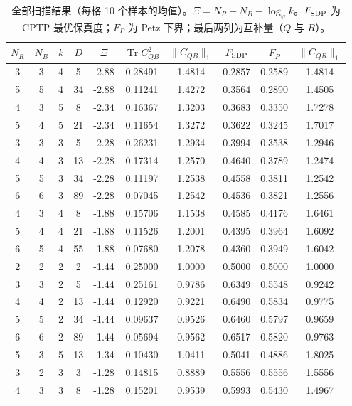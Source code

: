\documentclass[11pt,a4paper]{ctexart}
\theoremstyle{definition}
\newcommand{\Tr}{\operatorname{Tr}}
\newcommand{\ph}{\varphi}
\begin{document}
\begin{table}[h]\centering
\caption{全部扫描结果（每格 10 个样本的均值）。$\Xi=N_R-N_B-\log_\ph k$。$F_{\rm SDP}$ 为 CPTP 最优保真度；$F_P$ 为 Petz 下界；最后两列为互补量（$Q$ 与 $R$）。}
\label{tab:scan}
\small
\begin{tabular}{cccccccccc}
\toprule
$N_R$ & $N_B$ & $k$ & $D$ & $\Xi$ & $\Tr C_{QB}^2$ & $\|C_{QB}\|_1$ & $F_{\rm SDP}$ & $F_P$ & $\|C_{QR}\|_1$\\
\midrule
3 & 3 & 4 & 5 & -2.88 & 0.28491 & 1.4814 & 0.2857 & 0.2589 & 1.4814 \\
5 & 5 & 4 & 34 & -2.88 & 0.11241 & 1.4272 & 0.3564 & 0.2890 & 1.4505 \\
4 & 3 & 5 & 8 & -2.34 & 0.16367 & 1.3203 & 0.3683 & 0.3350 & 1.7278 \\
5 & 4 & 5 & 21 & -2.34 & 0.11654 & 1.3272 & 0.3622 & 0.3245 & 1.7017 \\
3 & 3 & 3 & 5 & -2.28 & 0.26231 & 1.2934 & 0.3994 & 0.3538 & 1.2946 \\
4 & 4 & 3 & 13 & -2.28 & 0.17314 & 1.2570 & 0.4640 & 0.3789 & 1.2474 \\
5 & 5 & 3 & 34 & -2.28 & 0.11197 & 1.2538 & 0.4558 & 0.3811 & 1.2542 \\
6 & 6 & 3 & 89 & -2.28 & 0.07045 & 1.2542 & 0.4536 & 0.3821 & 1.2556 \\
4 & 3 & 4 & 8 & -1.88 & 0.15706 & 1.1538 & 0.4585 & 0.4176 & 1.6461 \\
5 & 4 & 4 & 21 & -1.88 & 0.11526 & 1.2001 & 0.4395 & 0.3964 & 1.6092 \\
6 & 5 & 4 & 55 & -1.88 & 0.07680 & 1.2078 & 0.4360 & 0.3949 & 1.6042 \\
2 & 2 & 2 & 2 & -1.44 & 0.25000 & 1.0000 & 0.5000 & 0.5000 & 1.0000 \\
3 & 3 & 2 & 5 & -1.44 & 0.25161 & 0.9786 & 0.6349 & 0.5548 & 0.9242 \\
4 & 4 & 2 & 13 & -1.44 & 0.12920 & 0.9221 & 0.6490 & 0.5834 & 0.9775 \\
5 & 5 & 2 & 34 & -1.44 & 0.09637 & 0.9526 & 0.6460 & 0.5797 & 0.9659 \\
6 & 6 & 2 & 89 & -1.44 & 0.05694 & 0.9562 & 0.6517 & 0.5820 & 0.9763 \\
5 & 3 & 5 & 13 & -1.34 & 0.10430 & 1.0411 & 0.5041 & 0.4886 & 1.8025 \\
3 & 2 & 3 & 3 & -1.28 & 0.14815 & 0.8889 & 0.5556 & 0.5556 & 1.5556 \\
4 & 3 & 3 & 8 & -1.28 & 0.15201 & 0.9539 & 0.5993 & 0.5430 & 1.4967 \\

\end{tabular}
\end{table}
\end{document}
